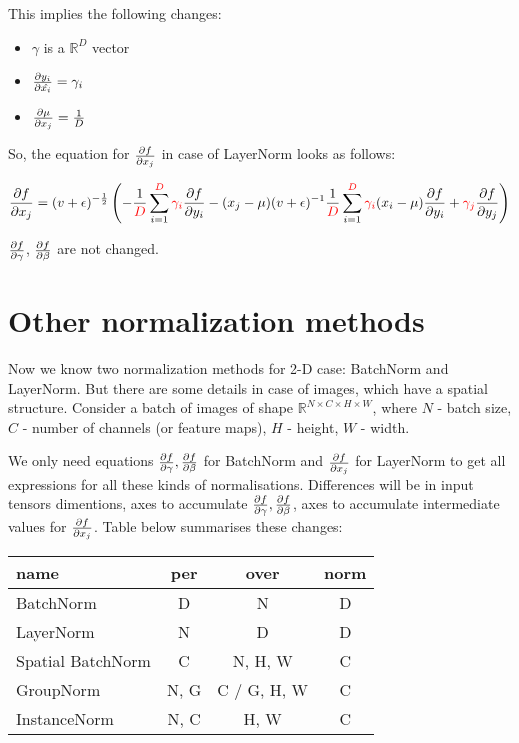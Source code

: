 \documentclass[12pt]{article}
\begin{document}
This implies the following changes:

\begin{itemize}
\item $\gamma$ is a $\mathbb{R}^D$ vector
\item $\pdv{y_i}{\hat{x_i}} = \gamma_i$
\item $\pdv{\mu}{x_j} = \frac{1}{D}$
\end{itemize}


So, the equation for $\pdv{f}{x_j}$ in case of LayerNorm looks as follows:

\[	
	\pdv{f}{x_j} = 
	(v + \epsilon)^{-\frac{1}{2}} 
	\left(	
		- \frac{1}{\begingroup\color{red} D \endgroup} 
		\sum_{i=1}^{\begingroup\color{red} D \endgroup} 
		\begingroup\color{red} \gamma_i \endgroup
		\pdv{f}{y_i}
		- (x_j - \mu) (v + \epsilon)^{-1} 
		\frac{1}{\begingroup\color{red} D \endgroup} 
		\sum_{i=1}^{\begingroup\color{red} D \endgroup} 
		\begingroup\color{red} \gamma_i \endgroup
		(x_i - \mu) \pdv{f}{y_i} 
		+ \begingroup\color{red} \gamma_j \endgroup \pdv{f}{y_j}
	\right)
\]

$\pdv{f}{\gamma}$, $\pdv{f}{\beta}$ are not changed.

\section*{Other normalization methods}

Now we know two normalization methods for 2-D case: BatchNorm and LayerNorm. But there are some details in case of images, which have a spatial structure. Consider a batch of images of shape $\mathbb{R}^{N \times C \times H \times W}$, where $N$ - batch size, $C$ - number of channels (or feature maps), $H$ - height, $W$ - width.

We only need equations $\pdv{f}{\gamma}, \pdv{f}{\beta}$ for BatchNorm and $\pdv{f}{x_j}$ for LayerNorm to get all expressions for all these kinds of normalisations. Differences will be in input tensors dimentions, axes to accumulate $\pdv{f}{\gamma}, \pdv{f}{\beta}$, axes to accumulate intermediate values for $\pdv{f}{x_j}$. Table below summarises these changes:

\begin{center}
\begin{tabular}{||l c c c||} 
 \hline
 name & per & over & norm \\ [0.5ex] 
 \hline
 \hline 
 
 BatchNorm & D & N & D \\ 
 \hline
 LayerNorm & N & D & D \\
 \hline
 Spatial BatchNorm & C & N, H, W & C \\
 \hline
 GroupNorm & N, G & C / G, H, W & C \\
 \hline
 InstanceNorm & N, C & H, W & C \\ [1ex] 
 \hline
\end{tabular}
\end{center}
\end{document}
